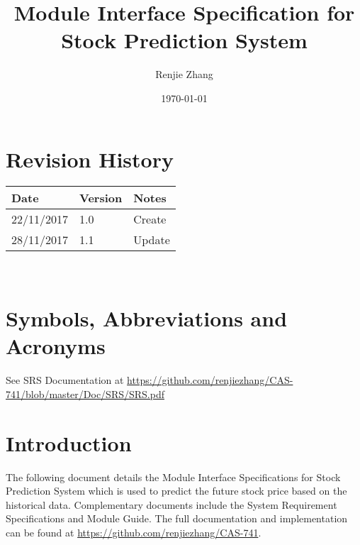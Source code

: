 \documentclass[12pt, titlepage]{article}
\begin{document}
\title{Module Interface Specification for Stock Prediction System}

\author{Renjie Zhang}

\date{\today}

\maketitle


\section{Revision History}

\begin{tabularx}{\textwidth}{p{3cm}p{2cm}X}
\toprule {\bf Date} & {\bf Version} & {\bf Notes}\\
\midrule
22/11/2017 & 1.0 & Create\\
28/11/2017 & 1.1 & Update\\
\bottomrule
\end{tabularx}

~\newpage

\section{Symbols, Abbreviations and Acronyms}

See SRS Documentation at \url{https://github.com/renjiezhang/CAS-741/blob/master/Doc/SRS/SRS.pdf}


\newpage

\tableofcontents

\newpage


\section{Introduction}

The following document details the Module Interface Specifications for
Stock Prediction System which is used to predict the future stock price based on the historical data. Complementary documents include the System Requirement Specifications
and Module Guide. The full documentation and implementation can be
found at \url{https://github.com/renjiezhang/CAS-741}.\\
\end{document}
